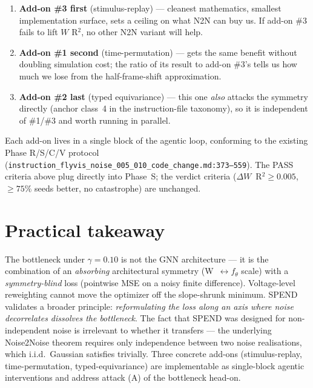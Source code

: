 \documentclass[11pt]{article}
\begin{document}
\begin{enumerate}
  \item \textbf{Add-on \#3 first} (stimulus-replay) --- cleanest mathematics,
    smallest implementation surface, sets a ceiling on what N2N can buy us.
    If add-on \#3 fails to lift $W$ R$^2$, no other N2N variant will help.
  \item \textbf{Add-on \#1 second} (time-permutation) --- gets the same
    benefit without doubling simulation cost; the ratio of its result to
    add-on \#3's tells us how much we lose from the half-frame-shift
    approximation.
  \item \textbf{Add-on \#2 last} (typed equivariance) --- this one
    \emph{also} attacks the symmetry directly (anchor class~4 in the
    instruction-file taxonomy), so it is independent of \#1/\#3 and worth
    running in parallel.
\end{enumerate}

Each add-on lives in a single block of the agentic loop, conforming to the
existing Phase R/S/C/V protocol
(\texttt{instruction\_flyvis\_noise\_005\_010\_code\_change.md:373--559}). The
PASS criteria above plug directly into Phase~S; the verdict criteria
($\Delta W$~R$^2 \geq 0.005$, $\geq 75\%$ seeds better, no catastrophe)
are unchanged.

\section{Practical takeaway}

The bottleneck under $\gamma=0.10$ is not the GNN architecture --- it is the
combination of an \emph{absorbing} architectural symmetry
(W~$\leftrightarrow f_\theta$ scale) with a \emph{symmetry-blind} loss
(pointwise MSE on a noisy finite difference). Voltage-level reweighting
cannot move the optimizer off the slope-shrunk minimum. SPEND validates a
broader principle: \emph{reformulating the loss along an axis where noise
decorrelates dissolves the bottleneck}. The fact that SPEND was designed for
non-independent noise is irrelevant to whether it transfers --- the
underlying Noise2Noise theorem requires only independence between two
noise realisations, which i.i.d.\ Gaussian satisfies trivially. Three concrete
add-ons (stimulus-replay, time-permutation, typed-equivariance) are
implementable as single-block agentic interventions and address attack (A)
of the bottleneck head-on.
\end{document}
